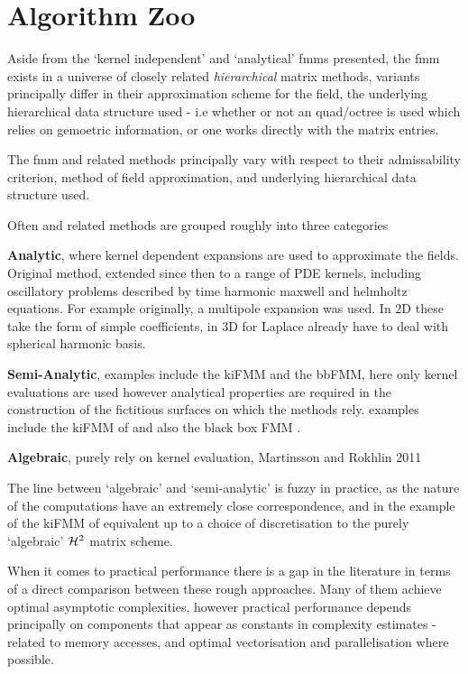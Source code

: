 
\section{Algorithm Zoo}\label{chpt:fmm:sec:algorithm_zoo}

Aside from the `kernel independent' and `analytical' \glspl{fmm} presented, the \acrshort{fmm} exists in a universe of closely related \textit{hierarchical} matrix methods, variants principally differ in their approximation scheme for the field, the underlying hierarchical data structure used - i.e whether or not an quad/octree is used which relies on gemoetric information, or one works directly with the matrix entries.

The \acrshort{fmm} and related methods principally vary with respect to their admissability criterion, method of field approximation, and underlying hierarchical data structure used.

Often  and related methods are grouped roughly into three categories

\textbf{Analytic}, where kernel dependent expansions are used to approximate the fields. Original method, extended since then to a range of PDE kernels, including oscillatory problems described by time harmonic maxwell and helmholtz equations. For example originally, a multipole expansion was used. In 2D these take the form of simple coefficients, in 3D for Laplace already have to deal with spherical harmonic basis.

\textbf{Semi-Analytic}, examples include the kiFMM and the bbFMM, here only kernel evaluations are used however analytical properties are required in the construction of the fictitious surfaces on which the methods rely. examples include the kiFMM of \cite{Ying:2004:JCP} and also the black box FMM \cite{fong2009black}.

\textbf{Algebraic}, purely rely on kernel evaluation, Martinsson and Rokhlin 2011 \cite{martinsson2007accelerated}

The line between `algebraic' and `semi-analytic' is fuzzy in practice, as the nature of the computations have an extremely close correspondence, and in the example of the kiFMM of \cite{Ying:2004:JCP} equivalent up to a choice of discretisation to the purely `algebraic' $\mathcal{H}^2$ matrix scheme.

When it comes to practical performance there is a gap in the literature in terms of a direct comparison between these rough approaches. Many of them achieve optimal asymptotic complexities, however practical performance depends principally on components that appear as constants in complexity estimates - related to memory accesses, and optimal vectorisation and parallelisation where possible.

